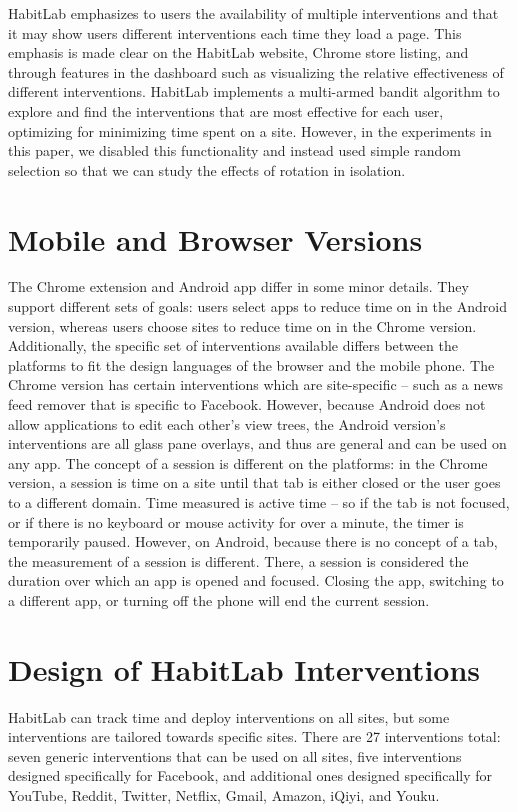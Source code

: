 HabitLab emphasizes to users the availability of multiple interventions and that it may show users different interventions each time they load a page. This emphasis is made clear on the HabitLab website, Chrome store listing, and through features in the dashboard such as visualizing the relative effectiveness of different interventions. HabitLab implements a multi-armed bandit algorithm to explore and find the interventions that are most effective for each user, optimizing for minimizing time spent on a site. However, in the experiments in this paper, we disabled this functionality and instead used simple random selection so that we can study the effects of rotation in isolation.

\section{Mobile and Browser Versions}

The Chrome extension and Android app differ in some minor details. They support different sets of goals: users select apps to reduce time on in the Android version, whereas users choose sites to reduce time on in the Chrome version. Additionally, the specific set of interventions available differs between the platforms to fit the design languages of the browser and the mobile phone. The Chrome version has certain interventions which are site-specific -- such as a news feed remover that is specific to Facebook. However, because Android does not allow applications to edit each other's view trees, the Android version's interventions are all glass pane overlays, and thus are general and can be used on any app. The concept of a session is different on the platforms: in the Chrome version, a session is time on a site until that tab is either closed or the user goes to a different domain. Time measured is active time -- so if the tab is not focused, or if there is no keyboard or mouse activity for over a minute, the timer is temporarily paused. However, on Android, because there is no concept of a tab, the measurement of a session is different. There, a session is considered the duration over which an app is opened and focused. Closing the app, switching to a different app, or turning off the phone will end the current session.

\section{Design of HabitLab Interventions}

HabitLab can track time and deploy interventions on all sites, but some interventions are tailored towards specific sites. There are 27 interventions total: seven generic interventions that can be used on all sites, five interventions designed specifically for Facebook, and additional ones designed specifically for YouTube, Reddit, Twitter, Netflix, Gmail, Amazon, iQiyi, and Youku.

